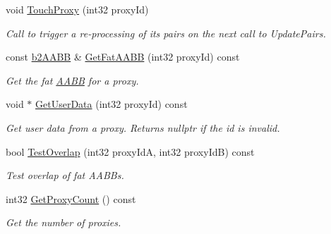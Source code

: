 \begin{DoxyCompactItemize}
void \hyperlink{classb2BroadPhase_a67b296431ebbc7b44037f21d645d9166}{Touch\+Proxy} (int32 proxy\+Id)
\begin{DoxyCompactList}\small\item\em Call to trigger a re-\/processing of it\textquotesingle{}s pairs on the next call to Update\+Pairs. \end{DoxyCompactList}\item 
\mbox{\label{classb2BroadPhase_aac8a590072e98a19fa0e9e6cfa37684f}} 
const \hyperlink{structb2AABB}{b2\+A\+A\+BB} \& \hyperlink{classb2BroadPhase_aac8a590072e98a19fa0e9e6cfa37684f}{Get\+Fat\+A\+A\+BB} (int32 proxy\+Id) const
\begin{DoxyCompactList}\small\item\em Get the fat \hyperlink{classAABB}{A\+A\+BB} for a proxy. \end{DoxyCompactList}\item 
\mbox{\label{classb2BroadPhase_a9d8134b21cc9d3786a62813dcabadcf4}} 
void $\ast$ \hyperlink{classb2BroadPhase_a9d8134b21cc9d3786a62813dcabadcf4}{Get\+User\+Data} (int32 proxy\+Id) const
\begin{DoxyCompactList}\small\item\em Get user data from a proxy. Returns nullptr if the id is invalid. \end{DoxyCompactList}\item 
\mbox{\label{classb2BroadPhase_a263cc21e2a3f1f892c20b048eca3cad6}} 
bool \hyperlink{classb2BroadPhase_a263cc21e2a3f1f892c20b048eca3cad6}{Test\+Overlap} (int32 proxy\+IdA, int32 proxy\+IdB) const
\begin{DoxyCompactList}\small\item\em Test overlap of fat A\+A\+B\+Bs. \end{DoxyCompactList}\item 
\mbox{\label{classb2BroadPhase_ab7a8c31223d8404b79f6c57e8fc69837}} 
int32 \hyperlink{classb2BroadPhase_ab7a8c31223d8404b79f6c57e8fc69837}{Get\+Proxy\+Count} () const
\begin{DoxyCompactList}\small\item\em Get the number of proxies. \end{DoxyCompactList}\item 
\mbox{\label{classb2BroadPhase_a0a1acd693466b997700242ae00784c20}} 

\end{DoxyCompactItemize}
